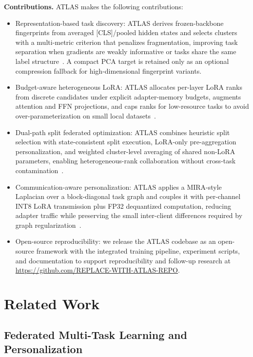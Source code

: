\documentclass[conference]{IEEEtran}
\begin{document}
\textbf{Contributions.}
ATLAS makes the following contributions:
\begin{itemize}
\item Representation-based task discovery: ATLAS derives frozen-backbone fingerprints from averaged [CLS]/pooled hidden states and selects clusters with a multi-metric criterion that penalizes fragmentation, improving task separation when gradients are weakly informative or tasks share the same label structure~\cite{sbert,cfl,ifca}. A compact PCA target is retained only as an optional compression fallback for high-dimensional fingerprint variants.
\item Budget-aware heterogeneous LoRA: ATLAS allocates per-layer LoRA ranks from discrete candidates under explicit adapter-memory budgets, augments attention and FFN projections, and caps ranks for low-resource tasks to avoid over-parameterization on small local datasets~\cite{lora,fah_qlora}.
\item Dual-path split federated optimization: ATLAS combines heuristic split selection with state-consistent split execution, LoRA-only pre-aggregation personalization, and weighted cluster-level averaging of shared non-LoRA parameters, enabling heterogeneous-rank collaboration without cross-task contamination~\cite{mira,splitfed,hsplitlora,pfedme}.
\item Communication-aware personalization: ATLAS applies a MIRA-style Laplacian over a block-diagonal task graph and couples it with per-channel INT8 LoRA transmission plus FP32 dequantized computation, reducing adapter traffic while preserving the small inter-client differences required by graph regularization~\cite{llm_int8,qlora,zeroquant,smoothquant}.
\item Open-source reproducibility: we release the ATLAS codebase as an open-source framework with the integrated training pipeline, experiment scripts, and documentation to support reproducibility and follow-up research at \url{https://github.com/REPLACE-WITH-ATLAS-REPO}.
\end{itemize}

\section{Related Work}
\label{sec:related}

\subsection{Federated Multi-Task Learning and Personalization}
\end{document}
